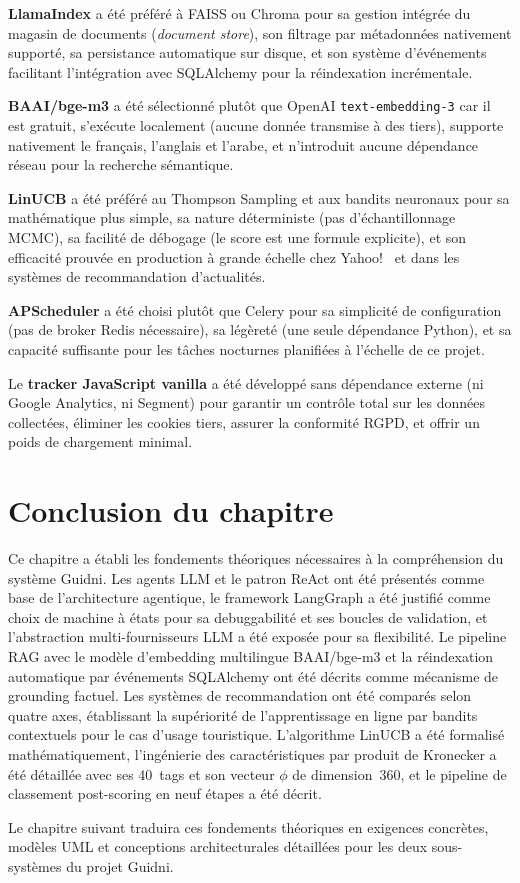 \textbf{LlamaIndex} a été préféré à FAISS ou Chroma pour sa gestion intégrée du magasin de
documents (\textit{document store}), son filtrage par métadonnées nativement supporté, sa
persistance automatique sur disque, et son système d'événements facilitant l'intégration avec
SQLAlchemy pour la réindexation incrémentale.

\textbf{BAAI/bge-m3} a été sélectionné plutôt que OpenAI \texttt{text-embedding-3} car il est
gratuit, s'exécute localement (aucune donnée transmise à des tiers), supporte nativement le
français, l'anglais et l'arabe, et n'introduit aucune dépendance réseau pour la recherche
sémantique.

\textbf{LinUCB} a été préféré au Thompson Sampling et aux bandits neuronaux pour sa mathématique
plus simple, sa nature déterministe (pas d'échantillonnage MCMC), sa facilité de débogage
(le score est une formule explicite), et son efficacité prouvée en production à grande échelle
chez Yahoo!~\cite{li2010linucb} et dans les systèmes de recommandation d'actualités.

\textbf{APScheduler} a été choisi plutôt que Celery pour sa simplicité de configuration
(pas de broker Redis nécessaire), sa légèreté (une seule dépendance Python), et sa capacité
suffisante pour les tâches nocturnes planifiées à l'échelle de ce projet.

Le \textbf{tracker JavaScript vanilla} a été développé sans dépendance externe (ni Google
Analytics, ni Segment) pour garantir un contrôle total sur les données collectées, éliminer
les cookies tiers, assurer la conformité RGPD, et offrir un poids de chargement minimal.


\section*{Conclusion du chapitre}

Ce chapitre a établi les fondements théoriques nécessaires à la compréhension du système Guidni.
Les agents LLM et le patron ReAct ont été présentés comme base de l'architecture agentique, le
framework LangGraph a été justifié comme choix de machine à états pour sa debuggabilité et ses
boucles de validation, et l'abstraction multi-fournisseurs LLM a été exposée pour sa flexibilité.
Le pipeline RAG avec le modèle d'embedding multilingue BAAI/bge-m3 et la réindexation automatique
par événements SQLAlchemy ont été décrits comme mécanisme de grounding factuel. Les systèmes de
recommandation ont été comparés selon quatre axes, établissant la supériorité de l'apprentissage
en ligne par bandits contextuels pour le cas d'usage touristique. L'algorithme LinUCB a été
formalisé mathématiquement, l'ingénierie des caractéristiques par produit de Kronecker a été
détaillée avec ses 40~tags et son vecteur $\phi$ de dimension~360, et le pipeline de classement
post-scoring en neuf étapes a été décrit.

Le chapitre suivant traduira ces fondements théoriques en exigences concrètes, modèles UML et
conceptions architecturales détaillées pour les deux sous-systèmes du projet Guidni.
